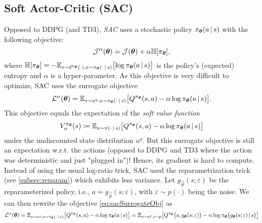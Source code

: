 		\subsection{Soft Actor-Critic (\acs{SAC})}
			Opposed to \ac{DDPG} (and \ac{TD3}), \emph{\ac{SAC}} uses a stochastic policy \(\pi_{\bm{\theta}}(a \,\vert\, s)\) with the following objective:
			\begin{equation}
				\mathcal{J}^\alpha(\bm{\theta}) = \mathcal{J}(\bm{\theta}) + \alpha \mathbb{H}[\pi_{\bm{\theta}}],
			\end{equation}
			where \( \mathbb{H}[\pi_{\bm{\theta}}] = -\mathbb{E}_{s \sim d^{\pi_{\bm{\theta}}}(\cdot), a \sim \pi_{\bm{\theta}}(\cdot \,\vert\, s)}\bigl[ \log \pi_{\bm{\theta}}(a \,\vert\, s) \bigr] \) is the policy's (expected) entropy and \(\alpha\) is a hyper-parameter. As this objective is very difficult to optimize, \ac{SAC} uses the surrogate objective
			\begin{equation}
				\mathcal{L}^\alpha(\bm{\theta}) = \mathbb{E}_{s \sim u^q, a \sim \pi_{\bm{\theta}}(\cdot \,\vert\, s)}\bigl[ Q^{\pi_{\bm{\theta}}}(s, a) - \alpha \log \pi_{\bm{\theta}}(a \,\vert\, s) \bigr].  \label{eq:sacSurrogateObj}
			\end{equation}
			This objective equals the expectation of the \emph{soft value function}
			\begin{equation}
				V^{\pi_{\bm{\theta}}}_\alpha(s) \coloneqq \mathbb{E}_{a \sim \pi(\cdot \,\vert\, s)}\bigl[ Q^{\pi_{\bm{\theta}}}(s, a) - \alpha \log \pi_{\bm{\theta}}(a \,\vert\, s) \bigr]
			\end{equation}
			under the undiscounted state distribution \(u^q\). But this surrogate objective is still an expectation w.r.t. the actions (opposed to \ac{DDPG} and \ac{TD3} where the action was deterministic and just "plugged in")! Hence, its gradient is hard to compute. Instead of using the usual log-ratio trick, \ac{SAC} used the reparametrization trick (see \autoref{subsec:reparam}) which exhibits less variance. Let \( g_{\vec{\theta}}(s; \varepsilon) \) be the reparameterized policy, i.e., \( a = g_{\vec{\theta}}(s; \varepsilon) \), with \( \varepsilon \sim p(\cdot) \) being the noise. We can then rewrite the objective \eqref{eq:sacSurrogateObj} as
			\begin{equation}
				\mathcal{L}^\alpha(\bm{\theta})
				= \mathbb{E}_{s \sim u^q, a \sim \pi_{\bm{\theta}}(\cdot \,\vert\, s)}\bigl[ Q^{\pi_{\bm{\theta}}}(s, a) - \alpha \log \pi_{\bm{\theta}}(a \,\vert\, s) \bigr]
				= \mathbb{E}_{s \sim u^q, \varepsilon \sim p}\bigl[ Q^{\pi_{\bm{\theta}}}\bigl(s, g_{\bm{\theta}}(s; \varepsilon)\bigr) - \alpha \log \pi_{\bm{\theta}}\bigl( g_{\bm{\theta}}(s; \varepsilon) \,\vert\, s \bigr) \bigr]
				\label{eq:sacObj}
			\end{equation}
